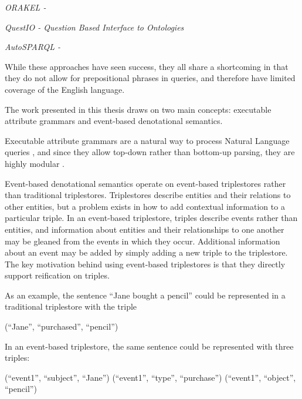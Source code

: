 \documentclass[../main.tex]{subfiles}
\begin{document}

{\em ORAKEL \cite{cimiano2007orakel} - }

{\em QuestIO \cite{tablan2008natural} - Question Based Interface to Ontologies}

{\em AutoSPARQL \cite{lehmann2011autosparql} - }


While these approaches have seen success, they all share a shortcoming in that they do not allow for prepositional phrases in queries, and therefore have limited coverage of the English language.


The work presented in this thesis draws on two main concepts: executable attribute grammars\cite{frosthafiz2008} and event-based denotational semantics\cite{frostagbola2014}.

Executable attribute grammars are a natural way to process Natural Language queries \cite{?}, and since they allow top-down rather than bottom-up parsing, they are highly modular \cite{frosthafiz2008}.

Event-based denotational semantics operate on event-based triplestores\cite{frost2014demonstration} rather than traditional triplestores.  Triplestores describe entities and their relations to other entities, but a problem exists in how to add contextual information to a particular triple.  In an event-based triplestore, triples describe events rather than entities, and information about entities and their relationships to one another may be gleaned from the events in which they occur.  Additional information about an event may be added by simply adding a new triple to the triplestore.  The key motivation behind using event-based triplestores is that they directly support reification on triples\cite{frost2014event}.

As an example, the sentence ``Jane bought a pencil'' could be represented in a traditional triplestore with the triple


\begin{code}
	(``Jane'', ``purchased'', ``pencil'')
\end{code}

In an event-based triplestore, the same sentence could be represented with three triples:

\begin{code}
	(``event1'', ``subject'', ``Jane'')
	(``event1'', ``type'', ``purchase'')
	(``event1'', ``object'', ``pencil'')
\end{code}
	
\end{document}

